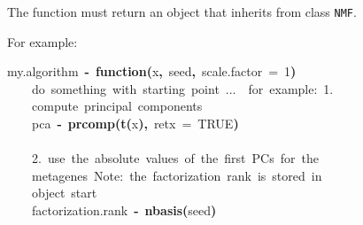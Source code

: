 \documentclass[a4paper]{article}\usepackage{graphicx, color}
\makeatletter
\newcommand{\hlnumber}[1]{\textcolor[rgb]{0,0,0}{#1}}%
\newcommand{\hlfunctioncall}[1]{\textcolor[rgb]{0.501960784313725,0,0.329411764705882}{\textbf{#1}}}%
\newcommand{\hlkeyword}[1]{\textcolor[rgb]{0,0,0}{\textbf{#1}}}%
\newcommand{\hlargument}[1]{\textcolor[rgb]{0.690196078431373,0.250980392156863,0.0196078431372549}{#1}}%
\newcommand{\hlcomment}[1]{\textcolor[rgb]{0.180392156862745,0.6,0.341176470588235}{#1}}%
\newcommand{\hlformalargs}[1]{\textcolor[rgb]{0.690196078431373,0.250980392156863,0.0196078431372549}{#1}}%
\newcommand{\hleqformalargs}[1]{\textcolor[rgb]{0.690196078431373,0.250980392156863,0.0196078431372549}{#1}}%
\newcommand{\hlassignement}[1]{\textcolor[rgb]{0,0,0}{\textbf{#1}}}%
\newcommand{\hlsymbol}[1]{\textcolor[rgb]{0,0,0}{#1}}%
\newcommand{\hlstd}[1]{\textcolor[rgb]{0,0,0}{#1}}%
\newenvironment{kframe}{%
 \def\FrameCommand##1{\hskip\@totalleftmargin \hskip-\fboxsep
 \colorbox{shadecolor}{##1}\hskip-\fboxsep
     \hskip-\linewidth \hskip-\@totalleftmargin \hskip\columnwidth}%
 \MakeFramed {\advance\hsize-\width
   \@totalleftmargin\z@ \linewidth\hsize
   \@setminipage}}%
 {\par\unskip\endMakeFramed}
\newenvironment{knitrout}{}{} %
\let\code=\texttt
\makeatother
\begin{document}
The function must return an object that inherits from class \code{NMF}.

For example:
\begin{knitrout}
\color{fgcolor}\begin{kframe}
\begin{flushleft}
\ttfamily\noindent
\hlsymbol{my.algorithm}{\ }\hlassignement{\usebox{\hlnormalsizeboxlessthan}-}{\ }\hlkeyword{function}\hlkeyword{(}\hlformalargs{x}\hlkeyword{,}{\ }\hlformalargs{seed}\hlkeyword{,}{\ }\hlformalargs{scale.factor}{\ }\hleqformalargs{=}{\ }\hlnumber{1}\hlkeyword{)}{\ }\hlkeyword{\usebox{\hlnormalsizeboxopenbrace}}\hspace*{\fill}\\
\hlstd{}{\ }{\ }{\ }{\ }\hlcomment{\usebox{\hlnormalsizeboxhash}{\ }do{\ }something{\ }with{\ }starting{\ }point{\ }...{\ }{\ }for{\ }example:{\ }1.}\hspace*{\fill}\\
\hlstd{}{\ }{\ }{\ }{\ }\hlcomment{\usebox{\hlnormalsizeboxhash}{\ }compute{\ }principal{\ }components}\hspace*{\fill}\\
\hlstd{}{\ }{\ }{\ }{\ }\hlsymbol{pca}{\ }\hlassignement{\usebox{\hlnormalsizeboxlessthan}-}{\ }\hlfunctioncall{prcomp}\hlkeyword{(}\hlfunctioncall{t}\hlkeyword{(}\hlsymbol{x}\hlkeyword{)}\hlkeyword{,}{\ }\hlargument{retx}{\ }\hlargument{=}{\ }\hlnumber{TRUE}\hlkeyword{)}\hspace*{\fill}\\
\hlstd{}\hspace*{\fill}\\
\hlstd{}{\ }{\ }{\ }{\ }\hlcomment{\usebox{\hlnormalsizeboxhash}{\ }2.{\ }use{\ }the{\ }absolute{\ }values{\ }of{\ }the{\ }first{\ }PCs{\ }for{\ }the}\hspace*{\fill}\\
\hlstd{}{\ }{\ }{\ }{\ }\hlcomment{\usebox{\hlnormalsizeboxhash}{\ }metagenes{\ }Note:{\ }the{\ }factorization{\ }rank{\ }is{\ }stored{\ }in}\hspace*{\fill}\\
\hlstd{}{\ }{\ }{\ }{\ }\hlcomment{\usebox{\hlnormalsizeboxhash}{\ }object{\ }\usebox{\hlnormalsizeboxsinglequote}start\usebox{\hlnormalsizeboxsinglequote}}\hspace*{\fill}\\
\hlstd{}{\ }{\ }{\ }{\ }\hlsymbol{factorization.rank}{\ }\hlassignement{\usebox{\hlnormalsizeboxlessthan}-}{\ }\hlfunctioncall{nbasis}\hlkeyword{(}\hlsymbol{seed}\hlkeyword{)}\hspace*{\fill}\\

\end{flushleft}
\end{kframe}
\end{knitrout}
\end{document}
